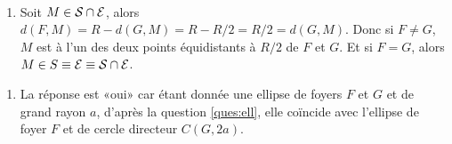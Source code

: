 \documentclass[a4paper,12pt,reqno]{amsart}
\begin{document}
\begin{solution}
  ~
  \vspace{-17mm}

  \begin{enumerate}[resume]
    \item Soit $M \in \mathcal{S} \cap \mathcal{E}$, alors $d(F,M) = R - d(G,M) = R-R/2 = R/2 = d(G,M)$. Donc si $F\neq G$, $M$ est à l'un des deux points équidistants à $R/2$ de $F$ et $G$. Et si $F = G$, alors $M \in S\equiv \mathcal{E} \equiv \mathcal{S} \cap \mathcal{E}$.
  \end{enumerate}

  \begin{enumerate}[resume]
    \item La réponse est «oui» car étant donnée une ellipse de foyers $F$ et $G$ et de grand rayon $a$, d'après la question \eqref{ques:ell}, elle coïncide avec l'ellipse de foyer $F$ et de cercle directeur $C(G,2a)$.
  \end{enumerate}
\end{solution}
\end{document}
